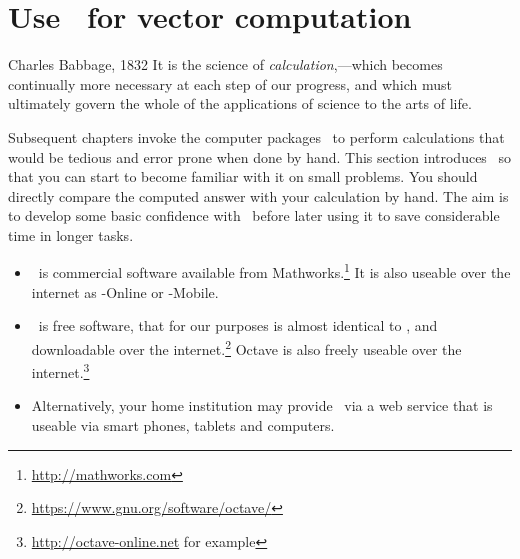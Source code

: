 

\section{Use \script\ for vector computation}
\label{sec:umovc}
\secttoc


\begin{quoted}{Charles Babbage, 1832}
It is the science of \emph{calculation},---which becomes continually more necessary at each step of our progress, and which must ultimately govern the whole of the applications of science to the arts of life.
\end{quoted}

Subsequent chapters invoke the computer packages \script\ to perform calculations that would be tedious and error prone when done by hand.
This section introduces \script\ so that you can start to become familiar with it on small problems.
You should directly compare the computed answer with your calculation by hand.
The aim is to develop some basic confidence with \script\ before later using it to save considerable time in longer tasks.

\begin{itemize}
\item  \script[1]\ is commercial software available from Mathworks.\footnote{\url{http://mathworks.com}}
It is also useable over the internet as \script[1]-Online or \script[1]-Mobile.
\item \script[2]\ is free software, that for our purposes is almost identical to \script[1], and downloadable over the internet.\footnote{\url{https://www.gnu.org/software/octave/}}
Octave is also freely useable over the internet.\footnote{\url{http://octave-online.net} for example} 
\item Alternatively, your home institution may provide \script\ via a web service that is useable via smart phones, tablets and computers.
\end{itemize}



\begin{comment}
Avoid plotting because I do not want to confuse a vector with a row vector of plot points.  Plotting is not high priority except for a few application sections.
\end{comment}





